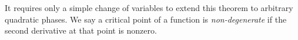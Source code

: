 \begin{comment}

  \[ D^{2k} a(x) = (2 \pi i \xi)^{2k} \int \widehat{a}(\xi) e^{2 \pi i \xi \cdot x}\; d\xi \]


  $e^{2 \pi i \lambda x^2}$ is
  \[ (2 \lambda)^{-1/2} e^{i \pi / 4} e^{- i \pi \xi^2 / 2 \lambda} \]
  Thus
  \[ I(\lambda) = (2 \lambda)^{-1/2} e^{i \pi / 4} \int_{-\infty}^\infty e^{-i \pi \xi^2 / 2 \lambda} \widehat{a}(\xi)\; d\xi. \]
  Now for any $N$, we can write
  \begin{align*}
    e^{-i \pi \xi^2 / 2 \lambda} &= \sum_{n = 0}^N \frac{1}{n!} \left( \frac{- i \pi \xi^2}{2 \lambda} \right)^n + O_N \left( (\xi^2 / \lambda)^{N+1} \right)
  \end{align*}
  Thus substituting in the Taylor series, and then applying the Fourier inversion formula, we find
  \begin{align*}
    I(\lambda) &= (2 \lambda)^{-1/2} e^{i \pi / 4} \sum_{n = 0}^N \frac{1}{n!} \int_{-\infty}^\infty \left( \frac{-i \pi \xi^2}{2 \lambda} \right)^n \widehat{a}(\xi)\; d\xi + O_{a,N} \left( 1/\lambda^{N+3/2} \right)\\
    &= (2 \lambda)^{-1/2} e^{i \pi / 4} \sum_{n = 0}^N (i/8\pi)^n \frac{1}{n!} \frac{1}{\lambda^n} \int_{-\infty}^\infty (2\pi i \xi)^{2n} \widehat{a}(\xi)\; d\xi + O_{a,N} \left( 1 / \lambda^{N+3/2} \right)\\
    &= (2 \lambda)^{-1/2} e^{i \pi / 4} \sum_{n = 0}^N \left( i/8\pi \right)^n \frac{a^{(2n)}(0)}{n!} \frac{1}{\lambda^n} + O_{a,N} \left( 1 / \lambda^{N+3/2} \right). \qedhere
  \end{align*}
\end{comment}


It requires only a simple change of variables to extend this theorem to arbitrary quadratic phases. We say a critical point of a function is \emph{non-degenerate} if the second derivative at that point is nonzero.

